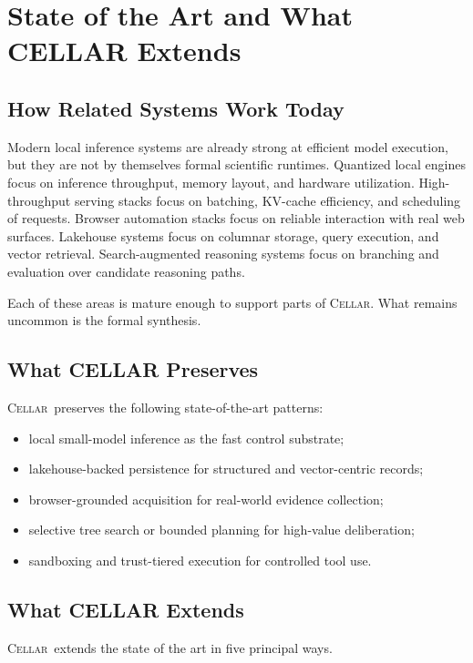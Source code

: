 \documentclass[11pt]{article}
\theoremstyle{definition}
\newcommand{\cellar}{\textsc{Cellar}}
\begin{document}
\section{State of the Art and What CELLAR Extends}

\subsection{How Related Systems Work Today}

Modern local inference systems are already strong at efficient model execution, but they are not by themselves formal scientific runtimes. Quantized local engines focus on inference throughput, memory layout, and hardware utilization. High-throughput serving stacks focus on batching, KV-cache efficiency, and scheduling of requests. Browser automation stacks focus on reliable interaction with real web surfaces. Lakehouse systems focus on columnar storage, query execution, and vector retrieval. Search-augmented reasoning systems focus on branching and evaluation over candidate reasoning paths.

Each of these areas is mature enough to support parts of \cellar. What remains uncommon is the formal synthesis.

\subsection{What CELLAR Preserves}

\cellar\ preserves the following state-of-the-art patterns:
\begin{itemize}[leftmargin=1.5em]
    \item local small-model inference as the fast control substrate;
    \item lakehouse-backed persistence for structured and vector-centric records;
    \item browser-grounded acquisition for real-world evidence collection;
    \item selective tree search or bounded planning for high-value deliberation;
    \item sandboxing and trust-tiered execution for controlled tool use.
\end{itemize}

\subsection{What CELLAR Extends}

\cellar\ extends the state of the art in five principal ways.
\end{document}
